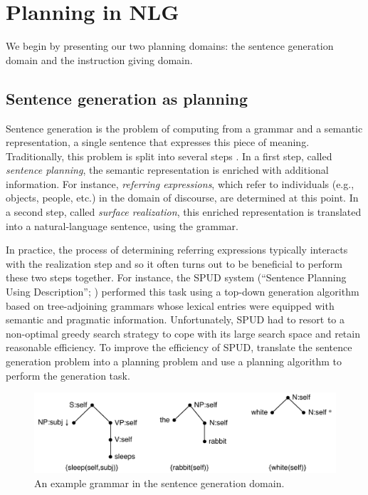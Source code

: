 \documentclass[letterpaper]{article}
\begin{document}
\section{Planning in NLG}
\label{sec:domains}

We begin by presenting our two planning domains: the sentence generation
domain and the instruction giving domain.


\subsection{Sentence generation as planning}

Sentence generation is the problem of computing from a grammar and a
semantic representation, a single sentence that expresses this piece of
meaning. Traditionally, this problem is split into several steps
\citep{reiter00building}. In a first step, called \emph{sentence planning},
the semantic representation is enriched with additional information. For
instance, \emph{referring expressions}, which refer to individuals (e.g.,
objects, people, etc.) in the domain of discourse, are determined at this
point. In a second step, called \emph{surface realization}, this enriched
representation is translated into a natural-language sentence, using the
grammar.

In practice, the process of determining referring expressions typically
interacts with the realization step and so it often turns out to be
beneficial to perform these two steps together. For instance, the SPUD
system (``Sentence Planning Using Description''; \citealt{Stone2003a})
performed this task using a top-down generation algorithm based on
tree-adjoining grammars \citep{joshi;etal1997} whose lexical entries were
equipped with semantic and pragmatic information. Unfortunately, SPUD had
to resort to a non-optimal greedy search strategy to cope with its large
search space and retain reasonable efficiency. To improve the efficiency
of SPUD, \citet{KolSto07} translate the sentence generation problem into a
planning problem and use a planning algorithm to perform the generation
task.


\begin{figure}[t]
  \centering
  \includegraphics[width=0.75\columnwidth]{pic-grammar}
  \caption{An example grammar in the sentence generation domain.}
  \label{fig:white-rabbit-sleeps-grammar}
\end{figure}
\end{document}
